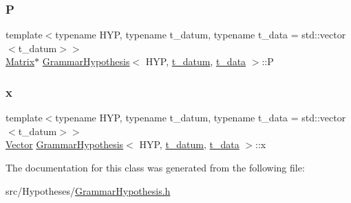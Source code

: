 \mbox{\label{class_grammar_hypothesis_a7154fb0938913f01dfd85efb76c46250}} 
\subsubsection{\texorpdfstring{P}{P}}
{\footnotesize\ttfamily template$<$typename H\+YP, typename t\+\_\+datum, typename t\+\_\+data = std\+::vector$<$t\+\_\+datum$>$$>$ \\
\hyperlink{_eigen_numerics_8h_a645222978e81acfb2523a9bce34aecc0}{Matrix}$\ast$ \hyperlink{class_grammar_hypothesis}{Grammar\+Hypothesis}$<$ H\+YP, \hyperlink{class_bayesable_a7c93a2eeab708378eb321745908718d4}{t\+\_\+datum}, \hyperlink{class_bayesable_a70a593a67c7d43239ecc06bb4fd06a6b}{t\+\_\+data} $>$\+::P}

\mbox{\label{class_grammar_hypothesis_a27fdb926401378fc46373ee57bb2a21f}} 
\subsubsection{\texorpdfstring{x}{x}}
{\footnotesize\ttfamily template$<$typename H\+YP, typename t\+\_\+datum, typename t\+\_\+data = std\+::vector$<$t\+\_\+datum$>$$>$ \\
\hyperlink{_eigen_numerics_8h_aca2956bc379bce2ed88ab3c0e1b61d1d}{Vector} \hyperlink{class_grammar_hypothesis}{Grammar\+Hypothesis}$<$ H\+YP, \hyperlink{class_bayesable_a7c93a2eeab708378eb321745908718d4}{t\+\_\+datum}, \hyperlink{class_bayesable_a70a593a67c7d43239ecc06bb4fd06a6b}{t\+\_\+data} $>$\+::x}



The documentation for this class was generated from the following file\+:\begin{DoxyCompactItemize}
\item 
src/\+Hypotheses/\hyperlink{_grammar_hypothesis_8h}{Grammar\+Hypothesis.\+h}\end{DoxyCompactItemize}
